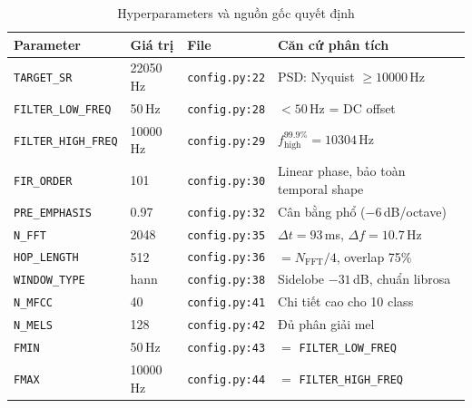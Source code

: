 \documentclass[12pt,a4paper]{article}
\begin{document}
\begin{table}[H]
\centering
\caption{Hyperparameters và nguồn gốc quyết định}
\label{tab:hyperparams}
\small
\begin{tabular}{@{}llll@{}}
\toprule
\textbf{Parameter} & \textbf{Giá trị} & \textbf{File} & \textbf{Căn cứ phân tích} \\
\midrule
\texttt{TARGET\_SR}        & 22050\,Hz  & \texttt{config.py:22} & PSD: Nyquist $\geq 10000$\,Hz \\
\texttt{FILTER\_LOW\_FREQ} & 50\,Hz     & \texttt{config.py:28} & $< 50$\,Hz = DC offset \\
\texttt{FILTER\_HIGH\_FREQ}& 10000\,Hz  & \texttt{config.py:29} & $f_\text{high}^{99.9\%} = 10304$\,Hz \\
\texttt{FIR\_ORDER}        & 101        & \texttt{config.py:30} & Linear phase, bảo toàn temporal shape \\
\texttt{PRE\_EMPHASIS}     & 0.97       & \texttt{config.py:32} & Cân bằng phổ ($-6$\,dB/octave) \\
\texttt{N\_FFT}            & 2048       & \texttt{config.py:35} & $\Delta t = 93$\,ms, $\Delta f = 10.7$\,Hz \\
\texttt{HOP\_LENGTH}       & 512        & \texttt{config.py:36} & $= N_\text{FFT}/4$, overlap 75\% \\
\texttt{WINDOW\_TYPE}      & hann       & \texttt{config.py:38} & Sidelobe $-31$\,dB, chuẩn librosa \\
\texttt{N\_MFCC}           & 40         & \texttt{config.py:41} & Chi tiết cao cho 10 class \\
\texttt{N\_MELS}           & 128        & \texttt{config.py:42} & Đủ phân giải mel \\
\texttt{FMIN}              & 50\,Hz     & \texttt{config.py:43} & $=$ \texttt{FILTER\_LOW\_FREQ} \\
\texttt{FMAX}              & 10000\,Hz  & \texttt{config.py:44} & $=$ \texttt{FILTER\_HIGH\_FREQ} \\
\bottomrule
\end{tabular}
\end{table}
\end{document}
